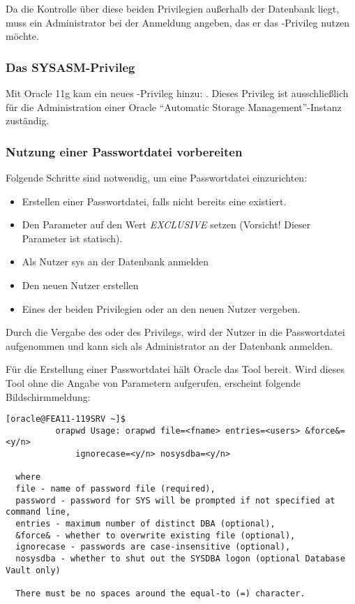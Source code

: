           \begin{merke}
            Da die Kontrolle \"uber diese beiden Privilegien au\ss{}erhalb der
            Datenbank liegt, muss ein Administrator bei der Anmeldung angeben,
            das er das -Privileg nutzen m\"ochte.
          \end{merke}
        \subsubsection{Das SYSASM-Privileg}
          Mit Oracle 11g kam ein neues -Privileg hinzu:
          . Dieses Privileg ist ausschlie\ss{}lich f\"ur die
          Administration einer Oracle \enquote{Automatic Storage
          Management}-Instanz zust\"andig.
        \subsubsection{Nutzung einer Passwortdatei vorbereiten}
          Folgende Schritte sind notwendig, um eine Passwortdatei einzurichten:
          \begin{itemize}
            \item Erstellen einer Passwortdatei, falls nicht bereits eine existiert.
            \item Den Parameter  auf den Wert \textit{EXCLUSIVE} setzen (Vorsicht! Dieser Parameter ist statisch).
            \item Als Nutzer sys an der Datenbank anmelden
            \item Den neuen Nutzer erstellen
            \item Eines der beiden Privilegien  oder  an den neuen Nutzer vergeben.
          \end{itemize}
          \begin{merke}
            Durch die Vergabe des  oder des  Privilegs, wird der Nutzer in die Passwort\-datei aufgenommen und kann sich als Administrator an der Datenbank anmelden.
          \end{merke}
          F\"ur die Erstellung einer Passwortdatei h\"alt Oracle das Tool  bereit. Wird dieses Tool ohne die Angabe von Parametern aufgerufen, erscheint folgende Bildschirmmeldung:
          \begin{lstlisting}[caption={Das Tool
          ORAPWD},label=admin209,language=terminal]
[oracle@FEA11-119SRV ~]$
          orapwd Usage: orapwd file=<fname> entries=<users> &force&=<y/n>
              ignorecase=<y/n> nosysdba=<y/n>

  where
  file - name of password file (required),
  password - password for SYS will be prompted if not specified at command line,
  entries - maximum number of distinct DBA (optional),
  &force& - whether to overwrite existing file (optional),
  ignorecase - passwords are case-insensitive (optional),
  nosysdba - whether to shut out the SYSDBA logon (optional Database Vault only)

  There must be no spaces around the equal-to (=) character.
          \end{lstlisting}
